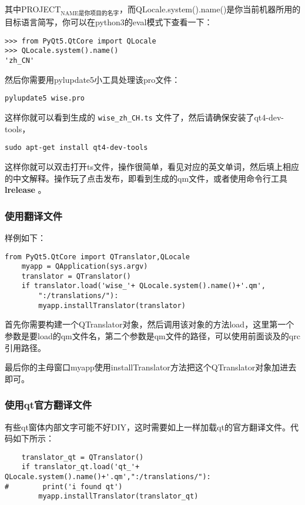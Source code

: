 \documentclass[11pt,oneside]{article}
\begin{document}
其中PROJECT\(_{\text{NAME是你项目的名字}}\)，而QLocale.system().name()是你当前机器所用的目标语言简写，你可以在python3的eval模式下查看一下：
\begin{Verbatim}
>>> from PyQt5.QtCore import QLocale
>>> QLocale.system().name()
'zh_CN'
\end{Verbatim}


然后你需要用pylupdate5小工具处理该pro文件：
\begin{verbatim}
pylupdate5 wise.pro
\end{verbatim}


这样你就可以看到生成的 \texttt{wise\_zh\_CH.ts} 文件了，然后请确保安装了qt4-dev-tools，
\begin{verbatim}
sudo apt-get install qt4-dev-tools
\end{verbatim}

这样你就可以双击打开ts文件，操作很简单，看见对应的英文单词，然后填上相应的中文解释。操作玩了点击发布，即看到生成的qm文件，或者使用命令行工具 \textbf{lrelease} 。

\subsubsection{使用翻译文件}
\label{sec:orgheadline43}
样例如下：
\begin{verbatim}
from PyQt5.QtCore import QTranslator,QLocale
    myapp = QApplication(sys.argv)
    translator = QTranslator()
    if translator.load('wise_'+ QLocale.system().name()+'.qm',
        ":/translations/"):
        myapp.installTranslator(translator)
\end{verbatim}

首先你需要构建一个QTranslator对象，然后调用该对象的方法load，这里第一个参数是要load的qm文件名，第二个参数是qm文件的路径，可以使用前面谈及的qrc引用路径。

最后你的主母窗口myapp使用installTranslator方法把这个QTranslator对象加进去即可。

\subsubsection{使用qt官方翻译文件}
\label{sec:orgheadline44}
有些qt窗体内部文字可能不好DIY，这时需要如上一样加载qt的官方翻译文件。代码如下所示：
\begin{verbatim}
    translator_qt = QTranslator()
    if translator_qt.load('qt_'+ QLocale.system().name()+'.qm',":/translations/"):
#        print('i found qt')
        myapp.installTranslator(translator_qt)
\end{verbatim}
\end{document}
